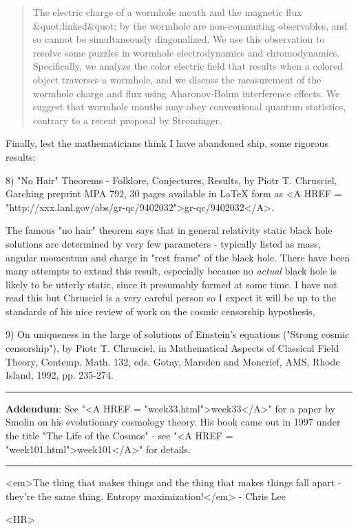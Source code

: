\begin{quote}
The electric charge of a wormhole mouth and the magnetic flux 
&quot;linked&quot; by
the wormhole are non-commuting observables, and so cannot be simultaneously
diagonalized.  We use this observation to resolve some puzzles in wormhole
electrodynamics and chromodynamics.  Specifically, we analyze the color
electric field that results when a colored object traverses a wormhole, and
we discuss the measurement of the wormhole charge and flux using Aharonov-Bohm
interference effects.  We suggest that wormhole mouths may obey conventional
quantum statistics, contrary to a recent proposal by Strominger.
\end{quote}
    

Finally, lest the mathematicians think I have abandoned ship, some
rigorous results:

8) "No Hair" Theorems - Folklore, Conjectures, Results, by  Piotr T.
Chrusciel, Garching preprint MPA 792, 30 pages available in LaTeX form
as <A HREF = "http://xxx.lanl.gov/abs/gr-qc/9402032">gr-qc/9402032</A>. 

The famous "no hair" theorem says that in general relativity static
black hole solutions are determined by very few parameters - typically
listed as mass, angular momentum and charge in "rest frame" of the black
hole.  There have been many attempts to extend this result, especially
because no \emph{actual} black hole is likely to be utterly static, since it
presumably formed at some time.  I have not read this but Chrusciel is a
very careful person so I expect it will be up to the standards of his
nice review of work on the cosmic censorship hypothesis,

9) On uniqueness in the large of solutions of Einstein's equations
("Strong cosmic censorship"), by Piotr T. Chrusciel, in Mathematical
Aspects of Classical Field Theory, Contemp. Math. 132, eds. Gotay,
Marsden and Moncrief, AMS, Rhode Island, 1992, pp. 235-274.

\par\noindent\rule{\textwidth}{0.4pt}
\textbf{Addendum}: 
See "<A HREF = "week33.html">week33</A>" for a paper 
by Smolin on his evolutionary cosmology theory.
His book came out in 1997 under the title
"The Life of the Cosmos" - see 
"<A HREF = "week101.html">week101</A>" for details.

\par\noindent\rule{\textwidth}{0.4pt}
<em>The thing that makes things
and the thing that makes things fall apart - they're the same
thing.  Entropy maximization!</em> - Chris Lee

<HR>



